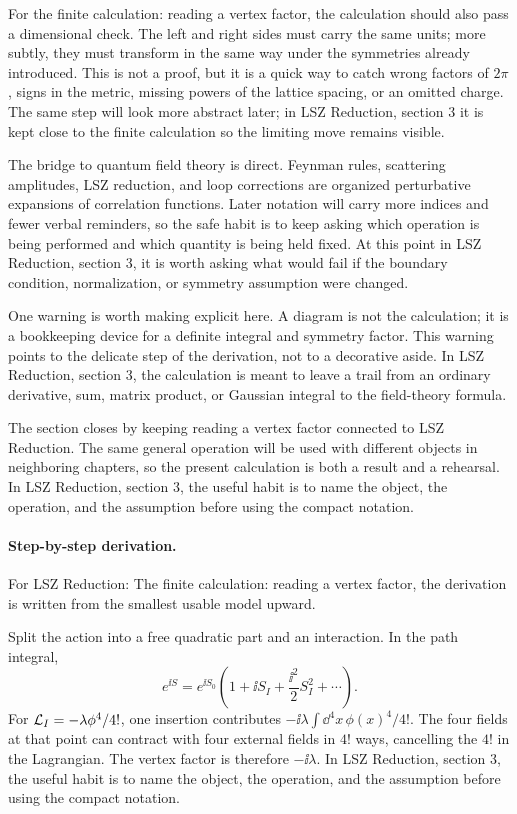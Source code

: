 For the finite calculation: reading a vertex factor, the calculation should also pass a dimensional check.  The left and right sides must carry the same units; more subtly, they must transform in the same way under the symmetries already introduced.  This is not a proof, but it is a quick way to catch wrong factors of \(2\pi\), signs in the metric, missing powers of the lattice spacing, or an omitted charge.  The same step will look more abstract later; in LSZ Reduction, section 3 it is kept close to the finite calculation so the limiting move remains visible.

The bridge to quantum field theory is direct.  Feynman rules, scattering amplitudes, LSZ reduction, and loop corrections are organized perturbative expansions of correlation functions.  Later notation will carry more indices and fewer verbal reminders, so the safe habit is to keep asking which operation is being performed and which quantity is being held fixed.  At this point in LSZ Reduction, section 3, it is worth asking what would fail if the boundary condition, normalization, or symmetry assumption were changed.

One warning is worth making explicit here.  A diagram is not the calculation; it is a bookkeeping device for a definite integral and symmetry factor.  This warning points to the delicate step of the derivation, not to a decorative aside.  In LSZ Reduction, section 3, the calculation is meant to leave a trail from an ordinary derivative, sum, matrix product, or Gaussian integral to the field-theory formula.

The section closes by keeping reading a vertex factor connected to LSZ Reduction.  The same general operation will be used with different objects in neighboring chapters, so the present calculation is both a result and a rehearsal.  In LSZ Reduction, section 3, the useful habit is to name the object, the operation, and the assumption before using the compact notation.



\paragraph{Step-by-step derivation.}

For LSZ Reduction: The finite calculation: reading a vertex factor, the derivation is written from the smallest usable model upward.

Split the action into a free quadratic part and an interaction.  In the path integral,
\[
  e^{\ii S}=e^{\ii S_0}\left(1+\ii S_I+\frac{\ii^2}{2}S_I^2+\cdots\right).
\]
For \(\mathcal L_I=-\lambda\phi^4/4!\), one insertion contributes \(-\ii\lambda\int\dd^4x\,\phi(x)^4/4!\).  The four fields at that point can contract with four external fields in \(4!\) ways, cancelling the \(4!\) in the Lagrangian.  The vertex factor is therefore \(-\ii\lambda\).  In LSZ Reduction, section 3, the useful habit is to name the object, the operation, and the assumption before using the compact notation.

